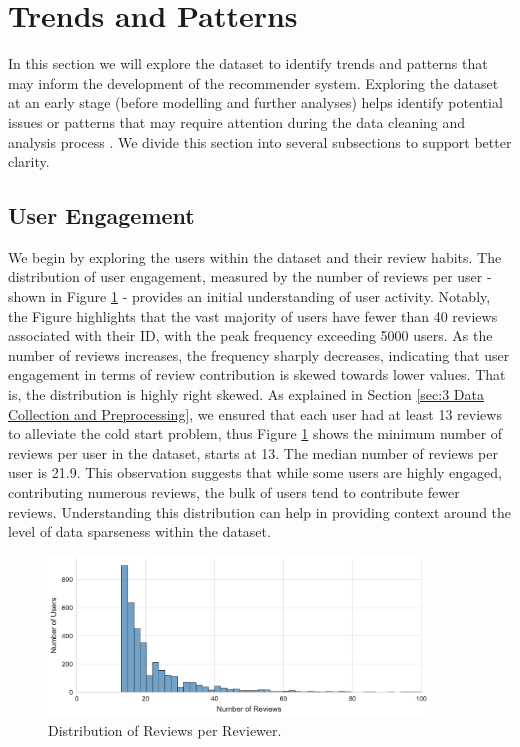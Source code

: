 \section{Trends and Patterns}
\label{sec:3 Trends and Patterns}

In this section we will explore the dataset to identify trends and patterns that may inform the development of the recommender system. Exploring the dataset at an early stage (before modelling and further analyses) helps identify potential issues or patterns that may require attention during the data cleaning and analysis process \cite{witten2005practical}. We divide this section into several subsections to support better clarity. 

\subsection{User Engagement}
\label{subsec:3 User Engagement}


We begin by exploring the users within the dataset and their review habits. The distribution of user engagement, measured by the number of reviews per user - shown in Figure \ref{fig:user review distribution} - provides an initial understanding of user activity. Notably, the Figure highlights that the vast majority of users have fewer than 40 reviews associated with their ID, with the peak frequency exceeding 5000 users. As the number of reviews increases, the frequency sharply decreases, indicating that user engagement in terms of review contribution is skewed towards lower values. That is, the distribution is highly right skewed. As explained in Section \ref{sec:3 Data Collection and Preprocessing}, we ensured that each user had at least 13 reviews to alleviate the cold start problem, thus Figure \ref{fig:user review distribution} shows the minimum number of reviews per user in the dataset, starts at 13. The median number of reviews per user is 21.9. This observation suggests that while some users are highly engaged, contributing numerous reviews, the bulk of users tend to contribute fewer reviews. Understanding this distribution can help in providing context around the level of data sparseness within the dataset.

\begin{figure}[ht]
  \centering
  \includegraphics[width=0.9\textwidth]{Figures/reviews_per_user_distribution.pdf} %
  \caption{Distribution of Reviews per Reviewer.}
  \label{fig:user review distribution}
\end{figure}

